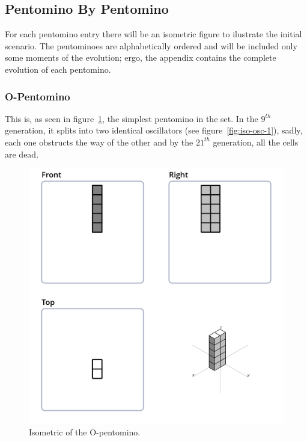 
\subsection{Pentomino By Pentomino}
For each pentomino entry there will be an isometric figure to ilustrate the
initial scenario. The pentominoes are alphabetically ordered and will be included
only some moments of the evolution; ergo, the appendix contains the complete
evolution of each pentomino.

\subsubsection{O-Pentomino}
This is, as seen in figure~\ref{fig:iso-pent-o}, the simplest pentomino in the
set. In the $9^{th}$ generation, it splits into two identical oscillators (see
figure~\ref{fig:iso-osc-1}), sadly, each one obstructs the way of the other and
by the $21^{th}$ generation, all the cells are dead.

\begin{figure}
	\centering
	\includegraphics[scale=0.3]{iso_diagrams/o.png}
	\caption{Isometric of the O-pentomino.}
  \label{fig:iso-pent-o}
\end{figure}

